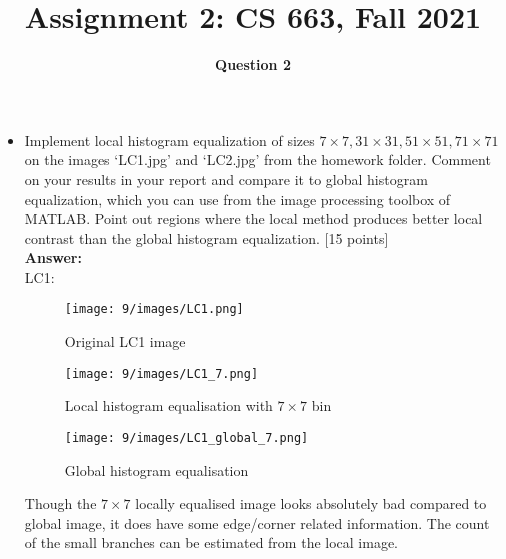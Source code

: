 \documentclass[12pt]{article}
\title{Assignment 2: CS 663, Fall 2021}
\author{\textbf{Question 2}}
\date{}
\begin{document}
\maketitle

\begin{itemize}
    \item Implement local histogram equalization of sizes $7 \times 7, 31 \times 31, 51 \times 51, 71 \times 71$ on the images `LC1.jpg' and `LC2.jpg' from the homework folder. Comment on your results in your report and compare it to global histogram equalization, which you can use from the image processing toolbox of MATLAB. Point out regions where the local method produces better local contrast than the global histogram equalization. \textsf{[15 points]}
    \vspace*{0.5cm}\\
    \textbf{Answer:} \\[20pt]
    LC1:\\[10pt]
    \begin{figure}[H]
        \centering
        \begin{minipage}{.45\textwidth}
          \centering
          \texttt{[image: 9/images/LC1.png]}
          \caption*{Original LC1 image}
        \end{minipage}
    \end{figure}
    \newpage
        
    \begin{figure}[H]
        \centering
        \begin{minipage}{.45\textwidth}
          \centering
          \texttt{[image: 9/images/LC1\_7.png]}
          \caption*{Local histogram equalisation with $7\times 7$ bin}
          \label{fig:totalpowervst}
        \end{minipage}
        \begin{minipage}{.45\textwidth}
          \centering
          \texttt{[image: 9/images/LC1\_global\_7.png]}
          \caption*{Global histogram equalisation}
          \label{fig:totalpower2}
        \end{minipage}
        \label{fig:totalPower}
    \end{figure}
    
    Though the $7\times 7$ locally equalised image looks absolutely bad compared to global image, it does have some edge/corner related information. The count of the small branches can be estimated from the local image.\\
    

\end{itemize}
\end{document}
